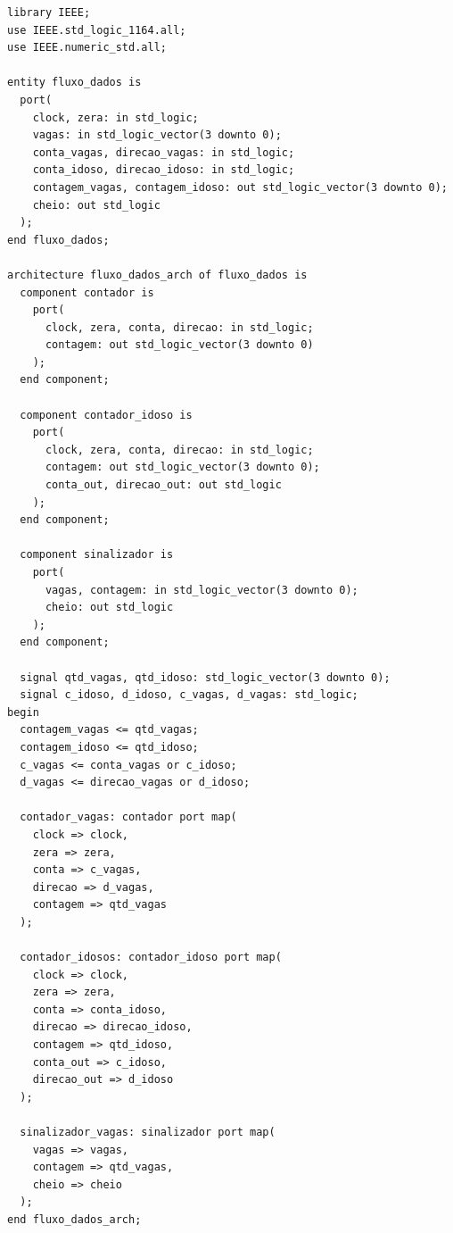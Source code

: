 \documentclass[a4,12pt]{horizon-theme}
\newenvironment{code}{\captionsetup{type=listing}}{}
\begin{document}
\begin{code}
\label{lst:fd}
\begin{verbatim}
library IEEE;
use IEEE.std_logic_1164.all;
use IEEE.numeric_std.all;

entity fluxo_dados is
  port(
    clock, zera: in std_logic;
    vagas: in std_logic_vector(3 downto 0);
    conta_vagas, direcao_vagas: in std_logic;
    conta_idoso, direcao_idoso: in std_logic;
    contagem_vagas, contagem_idoso: out std_logic_vector(3 downto 0);
    cheio: out std_logic
  );
end fluxo_dados;

architecture fluxo_dados_arch of fluxo_dados is
  component contador is
    port(
      clock, zera, conta, direcao: in std_logic;
      contagem: out std_logic_vector(3 downto 0)
    );
  end component;

  component contador_idoso is
    port(
      clock, zera, conta, direcao: in std_logic;
      contagem: out std_logic_vector(3 downto 0);
      conta_out, direcao_out: out std_logic
    );
  end component;

  component sinalizador is
    port(
      vagas, contagem: in std_logic_vector(3 downto 0);
      cheio: out std_logic
    );
  end component;

  signal qtd_vagas, qtd_idoso: std_logic_vector(3 downto 0);
  signal c_idoso, d_idoso, c_vagas, d_vagas: std_logic;
begin
  contagem_vagas <= qtd_vagas;
  contagem_idoso <= qtd_idoso;
  c_vagas <= conta_vagas or c_idoso;
  d_vagas <= direcao_vagas or d_idoso;
  
  contador_vagas: contador port map(
    clock => clock, 
    zera => zera, 
    conta => c_vagas, 
    direcao => d_vagas, 
    contagem => qtd_vagas
  );

  contador_idosos: contador_idoso port map(
    clock => clock, 
    zera => zera, 
    conta => conta_idoso,
    direcao => direcao_idoso, 
    contagem => qtd_idoso,
    conta_out => c_idoso,
    direcao_out => d_idoso
  );

  sinalizador_vagas: sinalizador port map(
    vagas => vagas,
    contagem => qtd_vagas,
    cheio => cheio
  );
end fluxo_dados_arch;
\end{verbatim}
\end{code}
\end{document}
